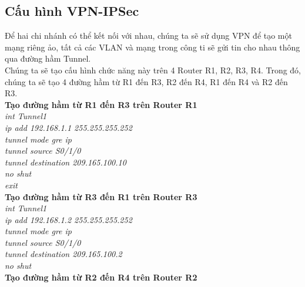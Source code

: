 \documentclass[a4paper, 12pt]{article}
\begin{document}
\subsection{Cấu hình VPN-IPSec }
\hspace*{1cm}Để hai chi nhánh có thể kết nối với nhau, chúng ta sẽ sử dụng VPN để tạo một mạng riêng ảo, tất cả các VLAN và mạng trong công ti sẽ gửi tin cho nhau thông qua đường hầm Tunnel.\\
\hspace*{1cm}Chúng ta sẽ tạo cấu hình chức năng này trên 4 Router R1, R2, R3, R4. Trong đó, chúng ta sẽ tạo 4 đường hầm từ R1 đến R3, R2 đến R4, R1 đến R4 và R2 đến R3.\\
\hspace*{1cm}\textbf{Tạo đường hầm từ R1 đến R3 trên Router R1}\\
\hspace*{2cm}\textit{int Tunnel1\\
\hspace*{2cm}ip add 192.168.1.1 255.255.255.252\\
\hspace*{2cm}tunnel mode gre ip\\
\hspace*{2cm}tunnel source S0/1/0\\
\hspace*{2cm}tunnel destination 209.165.100.10\\
\hspace*{2cm}no shut\\
\hspace*{2cm}exit\\}
\hspace*{1cm}\textbf{Tạo đường hầm từ R3 đến R1 trên Router R3}\\
\hspace*{2cm}\textit{int Tunnel1\\
\hspace*{2cm}ip add 192.168.1.2 255.255.255.252\\
\hspace*{2cm}tunnel mode gre ip\\
\hspace*{2cm}tunnel source S0/1/0\\
\hspace*{2cm}tunnel destination 209.165.100.2\\
\hspace*{2cm}no shut\\} 
\hspace*{1cm}\textbf{Tạo đường hầm từ R2 đến R4 trên Router R2}\\
\end{document}
